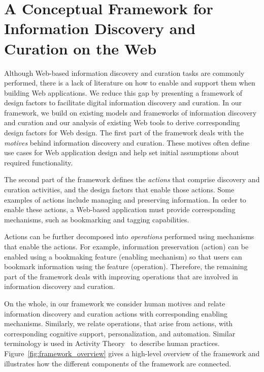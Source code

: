 \documentclass{sigchi}
\begin{document}
\section{A Conceptual Framework for Information Discovery and Curation on the Web}
\label{sec:framework}

Although Web-based information discovery and curation tasks are commonly performed, there is a lack of literature on how to enable and support them when building Web applications. We reduce this gap by presenting a framework of design factors to facilitate digital information discovery and curation. In our framework, we build on existing models and frameworks of information discovery and curation and our analysis of existing Web tools to derive corresponding design factors for Web design. The first part of the framework deals with the \textit{motives} behind information discovery and curation. These motives often define use cases for Web application design and help set initial assumptions about required functionality.

The second part of the framework defines the \textit{actions} that comprise discovery and curation activities, and the design factors that enable those actions. Some examples of actions include managing and preserving information. In order to enable these actions, a Web-based application must provide corresponding mechanisms, such as bookmarking and tagging capabilities.

Actions can be further decomposed into \textit{operations} performed using mechanisms that enable the actions. For example, information preservation (action) can be enabled using a bookmaking feature (enabling mechanism) so that users can bookmark information using the feature (operation). Therefore, the remaining part of the framework deals with improving operations that are involved in information discovery and curation.  

On the whole, in our framework we consider human motives and relate information discovery and curation actions with corresponding enabling mechanisms. Similarly, we relate operations, that arise from actions, with corresponding cognitive support, personalization, and automation.  Similar terminology is used in Activity Theory~\cite{kuutti1996activity} to describe human practices. Figure~\ref{fig:framework_overview} gives a high-level overview of the framework and illustrates how the different components of the framework are connected.
\end{document}
